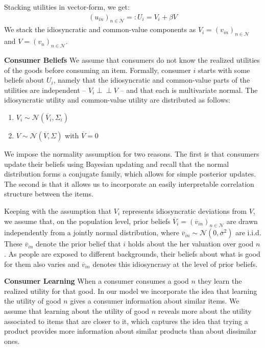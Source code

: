 \documentclass[sigconf]{acmart}
\begin{document}
Stacking utilities in vector-form, we get:
\begin{align*}
{\left(u_{in}\right)}_{n \in \mathcal{N}}=:U_i=V_i+ \beta V
\end{align*}
We stack the idiosyncratic and common-value components as $V_i ={\left(v_{in}\right)}_{n \in \mathcal{N}}$ and $V={\left(v_{n}\right)}_{n \in \mathcal{N}}$.
\par
\noindent \textbf{Consumer Beliefs} We assume that consumers do not know the realized utilities of the goods before consuming an item.  Formally, consumer $i$ starts with some beliefs about $U_i$, namely that the idiosyncratic and common-value parts of the utilities are independent -- $V_i \perp \!\!\! \perp V$ -- and that each is multivariate normal. The idiosyncratic utility and common-value utility are distributed as follows:
\begin{enumerate}
\item $V_i \sim \mathcal N (\overline V_i, \Sigma_i)$ 
\item $V \sim \mathcal N(\overline V, \Sigma)$ with $\overline V =0$
\end{enumerate}

We impose the normality assumption for two reasons. The first is that consumers update their beliefs using Bayesian updating and recall that the normal distribution forms a conjugate family, which allows for simple posterior updates. The second is that it allows us to incorporate an easily interpretable correlation structure between the items.

Keeping with the assumption that $V_i$ represents idiosyncratic deviations from $V$, we assume that, on the population level, prior beliefs $\overline V_i=\left(\overline v_{in}\right)_{n \in \mathcal{N}}$ are drawn independently from a jointly normal distribution, where $\overline v_{in} \sim \mathcal N (0, \overline \sigma^2)$ are i.i.d. These $\overline v_{in}$ denote the prior belief that $i$ holds about the her valuation over good $n$. As people are exposed to different backgrounds, their beliefs about what is good for them also varies and $\overline v_{in}$ denotes this idiosyncrasy at the level of prior beliefs.
\par
\noindent \textbf{Consumer Learning}
When a consumer consumes a good $n$ they learn the realized utility for that good. In our model we incorporate the idea that learning the utility of good $n$ gives a consumer information about similar items. We assume that learning about the utility of good $n$ reveals more about the utility associated to items that are closer to it, which captures the idea that trying a product provides more information about similar products than about dissimilar ones.
\end{document}
